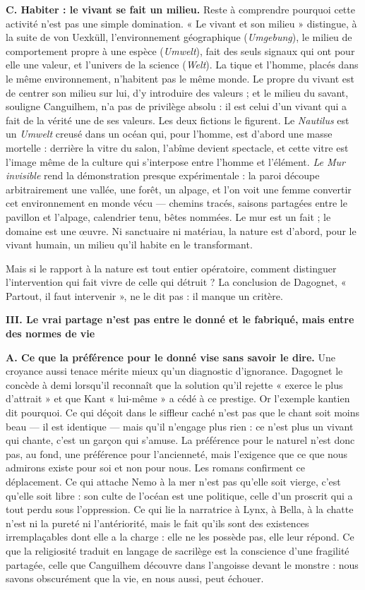 \documentclass[11pt,a4paper]{article}
\begin{document}
\textbf{C. Habiter : le vivant se fait un milieu.} Reste à comprendre pourquoi cette activité n'est pas une simple domination. « Le vivant et son milieu » distingue, à la suite de von Uexküll, l'environnement géographique (\emph{Umgebung}), le milieu de comportement propre à une espèce (\emph{Umwelt}), fait des seuls signaux qui ont pour elle une valeur, et l'univers de la science (\emph{Welt}). La tique et l'homme, placés dans le même environnement, n'habitent pas le même monde. Le propre du vivant est de centrer son milieu sur lui, d'y introduire des valeurs ; et le milieu du savant, souligne Canguilhem, n'a pas de privilège absolu : il est celui d'un vivant qui a fait de la vérité une de ses valeurs. Les deux fictions le figurent. Le \emph{Nautilus} est un \emph{Umwelt} creusé dans un océan qui, pour l'homme, est d'abord une masse mortelle : derrière la vitre du salon, l'abîme devient spectacle, et cette vitre est l'image même de la culture qui s'interpose entre l'homme et l'élément. \emph{Le Mur invisible} rend la démonstration presque expérimentale : la paroi découpe arbitrairement une vallée, une forêt, un alpage, et l'on voit une femme convertir cet environnement en monde vécu --- chemins tracés, saisons partagées entre le pavillon et l'alpage, calendrier tenu, bêtes nommées. Le mur est un fait ; le domaine est une œuvre. Ni sanctuaire ni matériau, la nature est d'abord, pour le vivant humain, un milieu qu'il habite en le transformant.

Mais si le rapport à la nature est tout entier opératoire, comment distinguer l'intervention qui fait vivre de celle qui détruit ? La conclusion de Dagognet, « Partout, il faut intervenir », ne le dit pas : il manque un critère.

\textbf{III. Le vrai partage n'est pas entre le donné et le fabriqué, mais entre des normes de vie}

\textbf{A. Ce que la préférence pour le donné vise sans savoir le dire.} Une croyance aussi tenace mérite mieux qu'un diagnostic d'ignorance. Dagognet le concède à demi lorsqu'il reconnaît que la solution qu'il rejette « exerce le plus d'attrait » et que Kant « lui-même » a cédé à ce prestige. Or l'exemple kantien dit pourquoi. Ce qui déçoit dans le siffleur caché n'est pas que le chant soit moins beau --- il est identique --- mais qu'il n'engage plus rien : ce n'est plus un vivant qui chante, c'est un garçon qui s'amuse. La préférence pour le naturel n'est donc pas, au fond, une préférence pour l'ancienneté, mais l'exigence que ce que nous admirons existe pour soi et non pour nous. Les romans confirment ce déplacement. Ce qui attache Nemo à la mer n'est pas qu'elle soit vierge, c'est qu'elle soit libre : son culte de l'océan est une politique, celle d'un proscrit qui a tout perdu sous l'oppression. Ce qui lie la narratrice à Lynx, à Bella, à la chatte n'est ni la pureté ni l'antériorité, mais le fait qu'ils sont des existences irremplaçables dont elle a la charge : elle ne les possède pas, elle leur répond. Ce que la religiosité traduit en langage de sacrilège est la conscience d'une fragilité partagée, celle que Canguilhem découvre dans l'angoisse devant le monstre : nous savons obscurément que la vie, en nous aussi, peut échouer.
\end{document}
